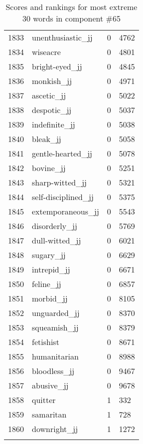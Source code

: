 \begin{longtable}[!htbp]{| rlr@{.}l |}
    1833 & unenthusiastic\_jj & 0 & 4762 \\
    1834 & wiseacre & 0 & 4801 \\
    1835 & bright-eyed\_jj & 0 & 4845 \\
    1836 & monkish\_jj & 0 & 4971 \\
    1837 & ascetic\_jj & 0 & 5022 \\
    1838 & despotic\_jj & 0 & 5037 \\
    1839 & indefinite\_jj & 0 & 5038 \\
    1840 & bleak\_jj & 0 & 5058 \\
    1841 & gentle-hearted\_jj & 0 & 5078 \\
    1842 & bovine\_jj & 0 & 5251 \\
    1843 & sharp-witted\_jj & 0 & 5321 \\
    1844 & self-disciplined\_jj & 0 & 5375 \\
    1845 & extemporaneous\_jj & 0 & 5543 \\
    1846 & disorderly\_jj & 0 & 5769 \\
    1847 & dull-witted\_jj & 0 & 6021 \\
    1848 & sugary\_jj & 0 & 6629 \\
    1849 & intrepid\_jj & 0 & 6671 \\
    1850 & feline\_jj & 0 & 6857 \\
    1851 & morbid\_jj & 0 & 8105 \\
    1852 & unguarded\_jj & 0 & 8370 \\
    1853 & squeamish\_jj & 0 & 8379 \\
    1854 & fetishist & 0 & 8671 \\
    1855 & humanitarian & 0 & 8988 \\
    1856 & bloodless\_jj & 0 & 9467 \\
    1857 & abusive\_jj & 0 & 9678 \\
    1858 & quitter & 1 & 332 \\
    1859 & samaritan & 1 & 728 \\
    1860 & downright\_jj & 1 & 1272 \\
    \hline
    \caption{Scores and rankings for most extreme 30 words in component \#65} \\
\end{longtable}
